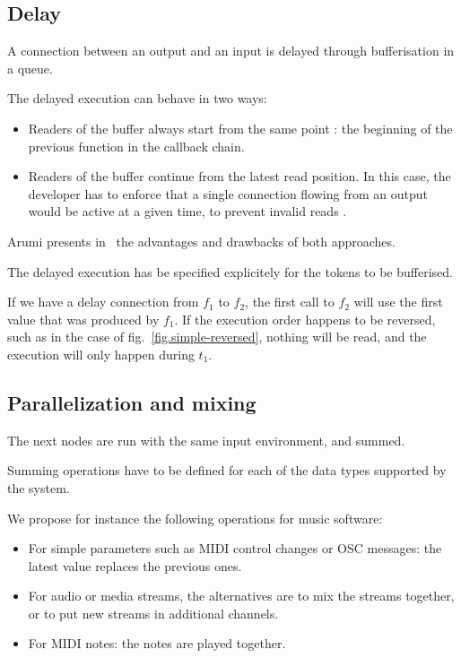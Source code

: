 \documentclass{article}
\begin{document}
\subsection{Delay}
A connection between an output and an input is delayed through bufferisation in a queue.
	
The delayed execution can behave in two ways:
\begin{itemize}
  \item Readers of the buffer always start from the same point : the beginning of the previous function in the callback chain.
  \item Readers of the buffer continue from the latest read position.
        In this case, the developer has to enforce that a single connection flowing from an output would be active at a given time, to prevent invalid reads .%
\end{itemize}

Arumi presents in~\cite{arumi2006dataflow} the advantages and drawbacks of both approaches.

The delayed execution has be specified explicitely for the tokens to be bufferised.
    
If we have a delay connection from $f_1$ to $f_2$, the first call to $f_2$ will use the first value that was produced by $f_1$.
If the execution order happens to be reversed, such as in the case of fig.~\ref{fig.simple-reversed}, nothing will be read, and the execution will only happen during $t_1$.
\subsection{Parallelization and mixing}
The next nodes are run with the same input environment, and summed.

Summing operations have to be defined for each of the data types supported by the system.

We propose for instance the following operations for music software: 
\begin{itemize}
  \item For simple parameters such as MIDI control changes or OSC messages: the latest value replaces the previous ones.
  \item For audio or media streams, the alternatives are to mix the streams together, or to put new streams in additional channels.
  \item For MIDI notes: the notes are played together.
\end{itemize}
\end{document}
